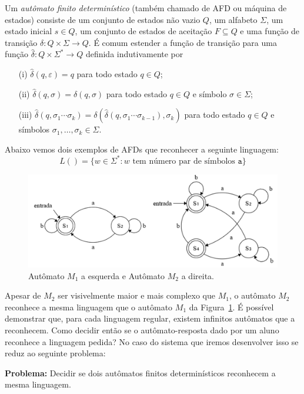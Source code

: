 \documentclass[plainsections,  24pt]{sciposter} %
\begin{document}
\begin{multicols}{2}
Um \textit{autômato finito determinístico} (também chamado de AFD ou máquina de estados) consiste de um conjunto de estados não vazio $Q$, um alfabeto $\Sigma$, um estado inicial $s \in Q$, um conjunto de estados de aceitação $F \subseteq Q$ e uma função de transição $\delta \colon Q \times \Sigma \rightarrow Q$. É comum estender a função de transição para uma função $\hat{\delta} \colon Q \times \Sigma^* \rightarrow Q$ definida indutivamente por

\begin{itemize}%
  \item[(i)] $\hat{\delta}(q, \varepsilon) = q$ para todo estado $q \in Q$;
  \item[(ii)] $\hat{\delta}(q, \sigma) = \delta(q, \sigma)$ para todo estado $q \in Q$ e símbolo $\sigma \in \Sigma$;
  \item[(iii)] $\hat{\delta}(q, \sigma_1 \cdots \sigma_k) = \delta(\hat{\delta}(q, \sigma_1 \cdots \sigma_{k-1}), \sigma_k)$ para todo estado $q \in Q$ e símbolos $\sigma_1, \dots, \sigma_k \in \Sigma$.
\end{itemize}

Abaixo vemos dois exemplos de AFDs que reconhecer a seguinte linguagem:
$$L() = \{w \in \Sigma^* :  w \text{ tem número par de símbolos } \mathtt{a}\}$$

\begin{figure}
  \centering
  \includegraphics[width=0.75\linewidth]{exemplo.png}
  \caption{Autômato $M_1$ a esquerda e Autômato $M_2$ a direita.}
  \label{fig:exemplo}
\end{figure}

Apesar de $M_2$ ser visivelmente maior e mais complexo que $M_1$, o autômato $M_2$ reconhece a mesma linguagem que o autômato $M_1$ da Figura~\ref{fig:exemplo}. É possível demonstrar que, para cada linguagem regular, existem infinitos autômatos que a reconhecem. Como decidir então se o autômato-resposta dado por um aluno reconhece a linguagem pedida? No caso do sistema que iremos desenvolver isso se reduz ao seguinte problema:
  
\noindent\textbf{Problema:} Decidir se dois autômatos finitos determinísticos reconhecem a mesma linguagem.


\end{multicols}
\end{document}
